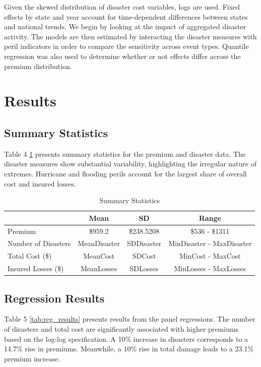 \documentclass[12pt]{article}
\begin{document}
Given the skewed distribution of disaster cost variables, logs are used. Fixed effects by state and year account for time-dependent 
differences between states and national trends. We begin by looking at the impact of aggregated disaster activity. The models are then 
estimated by interacting the disaster measures with peril indicators in order to compare the sensitivity across event types. Quantile 
regression was also used to determine whether or not effects differ across the premium distribution.



\section{Results}
\label{sec:resu}
\subsection{Summary Statistics}
Table 4 \ref{tab:summary} presents summary statistics for the premium and disaster data. The disaster measures show substantial variability, 
highlighting the irregular nature of extremes. Hurricane and flooding perils account for the largest share of overall cost and 
insured losses.

\begin{table}[h]
    \label{tab:summary}
    \centering
    \begin{tabular}{|l|c|c|c|}
        \hline
        & Mean & SD & Range \\
        \hline
        Premium & \$\num{959.2} & \$\num{238.5208} & \$\num{536} - \$\num{1311} \\
        Number of Disasters & MeanDisaster & SDDisaster & MinDisaster - MaxDisaster \\
        Total Cost (\$) & MeanCost & SDCost & MinCost - MaxCost \\
        Insured Losses (\$) & MeanLosses & SDLosses & MinLosses - MaxLosses \\
        \hline
    \end{tabular}
    \caption{Summary Statistics}
    \cite{statista, ncai, fema}
\end{table}

\subsection{Regression Results}
Table 5 \ref{tab:reg_results} presents results from the panel regressions. The number of disasters and total cost are significantly 
associated with higher premiums based on the log-log specification. A 10\% increase in disasters corresponds to a 14.7\% rise in 
premiums. Meanwhile, a 10\% rise in total damage leads to a 23.1\% premium increase.
\end{document}
